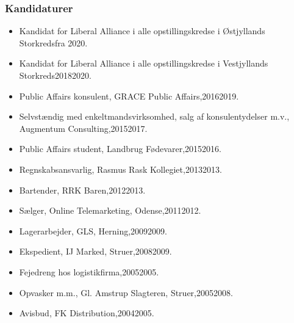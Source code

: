 \documentclass[11pt, a4paper]{awesome-cv}
\begin{document}
\begin{cvletter}
\subsubsection*{Kandidaturer}
\begin{itemize}
\item Kandidat for Liberal Alliance i alle opstillingskredse i Østjyllands Storkredsfra 2020.
\item Kandidat for Liberal Alliance i alle opstillingskredse i Vestjyllands Storkreds20182020.
\end{itemize}
\begin{itemize}
\item Public Affairs konsulent, GRACE Public Affairs,20162019.
\item Selvstændig med enkeltmandsvirksomhed, salg af konsulentydelser m.v., Augmentum Consulting,20152017.
\item Public Affairs student, Landbrug  Fødevarer,20152016.
\item Regnskabsansvarlig, Rasmus Rask Kollegiet,20132013.
\item Bartender, RRK Baren,20122013.
\item Sælger, Online Telemarketing, Odense,20112012.
\item Lagerarbejder, GLS, Herning,20092009.
\item Ekspedient, IJ Marked, Struer,20082009.
\item Fejedreng hos logistikfirma,20052005.
\item Opvasker m.m., Gl. Amstrup Slagteren, Struer,20052008.
\item Avisbud, FK Distribution,20042005.
\end{itemize}
\end{cvletter}
\end{document}
